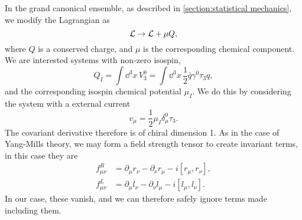 In the grand canonical ensemble, as described in \cref{section:statistical mechanics}, we modify the Lagrangian as
\begin{equation}
    \mathcal{L} \rightarrow \mathcal{L} + \mu Q,
\end{equation}
where $Q$ is a conserved charge, and $\mu$ is the corresponding chemical component.
We are interested systems with non-zero isospin, 
\begin{equation}
    Q_I = \int \dd^3 x \, V^0_3 = \int \dd^3 x \, \frac{1}{2}  \bar q \gamma^0 \tau_3 q,
\end{equation}
and the corresponding isospin chemical potential $\mu_I$.
We do this by considering the system with a external current
\begin{equation}
    v_\mu = \frac{1}{2} \mu_I \delta_\mu^0 \tau_3.
\end{equation}
The covariant derivative therefore is of chiral dimension 1.
As in the case of Yang-Mills theory, we may form a field strength tensor to create invariant terms, in this case they are
\begin{align}
    f_{\mu\nu}^R &= \partial_\mu r_\nu - \partial_\nu r_\mu - i [r_\mu, r_\nu], \\
    f_{\mu\nu}^L &= \partial_\mu l_\nu - \partial_\nu l_\mu - i [l_\mu, l_\nu].
\end{align}
In our case, these vanish, and we can therefore safely ignore terms made including them.

